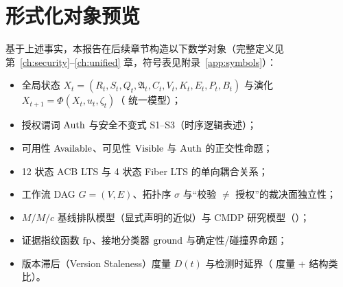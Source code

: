 \section{形式化对象预览}

基于上述事实，本报告在后续章节构造以下数学对象（完整定义见第~\ref{ch:security}--\ref{ch:unified} 章，符号表见附录~\ref{app:symbols}）：
\begin{itemize}[itemsep=0.05em]
  \item 全局状态 $X_t=(R_t,S_t,Q_t,\mathfrak{A}_t,C_t,V_t,K_t,E_t,P_t,B_t)$ 与演化 $X_{t+1}=\Phi(X_t,u_t,\zeta_t)$（\PROPOSED{} 统一模型）；
  \item 授权谓词 $\operatorname{Auth}$ 与安全不变式 S1--S3（时序逻辑表述）；
  \item 可用性 $\operatorname{Available}$、可见性 $\operatorname{Visible}$ 与 $\operatorname{Auth}$ 的正交性命题；
  \item 12 状态 ACB LTS 与 4 状态 Fiber LTS 的单向耦合关系；
  \item 工作流 DAG $G=(V,E)$、拓扑序 $\sigma$ 与“校验 $\neq$ 授权”的裁决面独立性；
  \item $M/M/c$ 基线排队模型（显式声明的近似）与 CMDP 研究模型（\PROPOSED）；
  \item 证据指纹函数 $\operatorname{fp}$、接地分类器 $\operatorname{ground}$ 与确定性/碰撞界命题；
  \item 版本滞后（Version Staleness）度量 $D(t)$ 与检测时延界（\PROPOSED{} 度量 + \STRONG{} 结构类比）。
\end{itemize}
